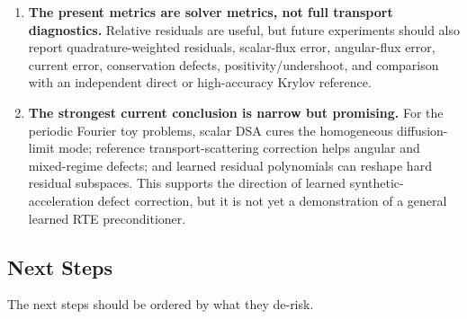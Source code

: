 \documentclass[11pt]{article}
\begin{document}
\begin{enumerate}
\item \textbf{The present metrics are solver metrics, not full transport
diagnostics.}
Relative residuals are useful, but future experiments should also report
quadrature-weighted residuals, scalar-flux error, angular-flux error, current
error, conservation defects, positivity/undershoot, and comparison with an
independent direct or high-accuracy Krylov reference.

\item \textbf{The strongest current conclusion is narrow but promising.}
For the periodic Fourier toy problems, scalar DSA cures the homogeneous
diffusion-limit mode; reference transport-scattering correction helps angular
and mixed-regime defects; and learned residual polynomials can reshape hard
residual subspaces.  This supports the direction of learned
synthetic-acceleration defect correction, but it is not yet a demonstration of
a general learned RTE preconditioner.
\end{enumerate}

\subsection{Next Steps}

The next steps should be ordered by what they de-risk.
\end{document}
